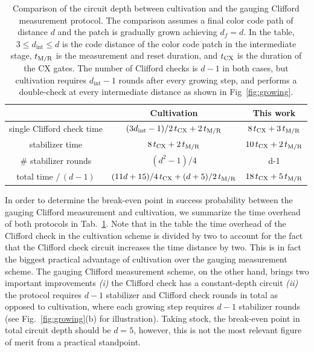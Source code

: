 \begin{table}[t]
    \centering
    \begin{tabular}{ccc}
        \hline
         & Cultivation & This work \\        
        \hline
        single Clifford check time & $(3d_\text{int}-1)/2\, t_\text{CX} + 2\, t_\text{M/R}$ & $8\,t_\text{CX} + 3\,t_\text{M/R}$ \\
        stabilizer time & $8\,t_\text{CX} + 2\,t_\text{M/R}$ & $10\,t_\text{CX} + 2\,t_\text{M/R}$\\
        \# stabilizer rounds & $(d^2-1)/4$ & d-1\\
        total time $/\, (d-1)$ & $(11d+15)/4\, t_\text{CX} + (d+5)/2\,t_\text{M/R}$ & $18\, t_\text{CX} + 5\,t_\text{M/R}$\\
        \hline
    \end{tabular}
    \caption{Comparison of the circuit depth between cultivation and the gauging Clifford measurement protocol. The comparison assumes a final color code path of distance $d$ and the patch is gradually grown achieving $d_f = d$. In the table, $3\leq d_\text{int} \leq d$ is the code distance of the color code patch in the intermediate stage, $t_\text{M/R}$ is the measurement and reset duration, and $t_\text{CX}$ is the duration of the CX gates. The number of Clifford checks is $d-1$ in both cases, but cultivation requires $d_\text{int}-1$ rounds after every growing step, and performs a double-check at every intermediate distance as shown in Fig~\ref{fig:growing}.}
    \label{tab:circuit_depth}
\end{table}

In order to determine the break-even point in success probability between the gauging Clifford measurement and cultivation, we summarize the time overhead of both protocols in Tab.~\ref{tab:circuit_depth}. Note that in the table the time overhead of the Clifford check in the cultivation scheme is divided by two to account for the fact that the Clifford check circuit increases the time distance by two. This is in fact the biggest practical advantage of cultivation over the gauging measurement scheme. The gauging Clifford measurement scheme, on the other hand, brings two important improvements {\it (i)} the Clifford check has a constant-depth circuit {\it (ii)} the protocol requires $d-1$ stabilizer and Clifford check rounds in total as opposed to cultivation, where each growing step requires $d-1$ stabilizer rounds (see Fig.~\ref{fig:growing}(b) for illustration). Taking stock, the break-even point in total circuit depth should be $d=5$, however, this is not the most relevant figure of merit from a practical standpoint.

